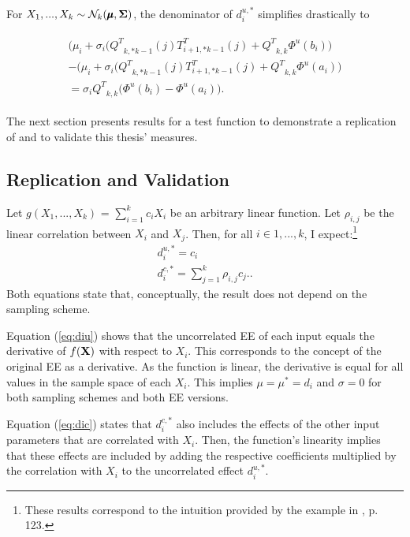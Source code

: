 For $X_1, ..., X_k \sim \mathcal{N}_k(\pmb{\mu}, \bold{\Sigma})$, the denominator of $d_i^{u,*}$ simplifies drastically to

\begin{align}
\begin{split}
\big(\mu_i + \sigma_i\big({Q^T}_{k,*k-1}(j)T_{i+1,*k-1}^T(j) + {Q^T}_{k,k} \Phi^u(b_i)\big) \\-  \big(\mu_i + \sigma_i\big({Q^T}_{k,*k-1}(j)T_{i+1,*k-1}^T(j) + {Q^T}_{k,k} \Phi^u(a_i)\big)\\= \sigma_i{Q^T}_{k,k}\big(\Phi^u(b_i)-\Phi^u(a_i)\big).
\end{split}
\end{align}

\noindent
The next section presents results for a test function to demonstrate a replication of \cite{ge2017extending} and to validate this thesis' measures.

\subsection{Replication and Validation}

Let $g(X_1, ..., X_k)$ = $\sum_{i = 1}^{k} c_i X_i$ be an arbitrary linear function. Let $\rho_{i,j}$ be the linear correlation between $X_i$ and $X_j$. Then, for all $i \in 1, ..., k$, I expect:\footnote{These results correspond to the intuition provided by the example in \cite{Saltelli.2008}, p. 123.}
\begin{align}
d_i^{u,*} = c_i \label{eq:diu}\\
d_i^{c,*} = \sum_{j = 1}^{k} \rho_{i,j} c_{j}. \label{eq:dic}.
\end{align}
Both equations state that, conceptually, the result does not depend on the sampling scheme.

Equation (\ref{eq:diu}) shows that the uncorrelated EE of each input equals the derivative of $f(\bold{X})$ with respect to $X_i$. This corresponds to the concept of the original EE as a derivative. As the function is linear, the derivative is equal for all values in the sample space of each $X_i$. This implies $\mu=\mu^*=d_i $ and $ \sigma=0$ for both sampling schemes and both EE versions.

Equation (\ref{eq:dic}) states that $d_i^{c,*}$ also includes the effects of the other input parameters that are correlated with $X_i$. Then, the function's linearity implies that these effects are included by adding the respective coefficients multiplied by the correlation with $X_i$ to the uncorrelated effect $d_i^{u,*}$.\\

